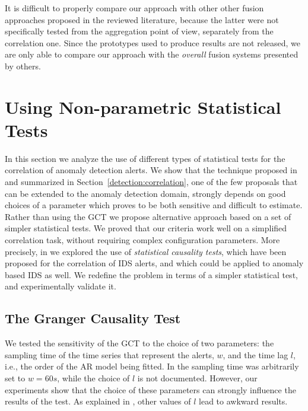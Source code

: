 It is difficult to properly compare our approach with other other fusion approaches proposed in the reviewed literature, because the latter were not specifically tested from the aggregation point of view, separately from the correlation one. Since the prototypes used to produce results are not released, we are only able to compare our approach with the \emph{overall} fusion systems presented by others. 

\section{Using Non-parametric Statistical Tests}
\label{correlation:causality}
In this section we analyze the use of different types of statistical
tests for the correlation of anomaly detection alerts. We show that
the technique proposed in \citep{dblp:conf/raid/qinl03} and summarized
in Section~\ref{detection:correlation}, one of the few proposals that
can be extended to the anomaly detection domain, strongly depends on
good choices of a parameter which proves to be both sensitive and
difficult to estimate. Rather than using the \acf{GCT} we propose
alternative approach \citep{MaggiZaneroRAID07} based on a set of
simpler statistical tests. We proved that our criteria work well on a
simplified correlation task, without requiring complex configuration
parameters. More precisely, in \citep{MaggiZaneroRAID07} we explored
the use of \emph{statistical causality tests}, which have been
proposed for the correlation of \ac{IDS} alerts, and which
could be applied to anomaly based \ac{IDS} as well. We
redefine the problem in terms of a simpler statistical test, and
experimentally validate it.

\subsection{The Granger Causality Test}
\label{correlation:causality:grang-caus-test}
We tested the sensitivity of the \ac{GCT} to the choice of
two parameters: the sampling time of the time series that represent
the alerts, $w$, and the time lag $l$, i.e., the order of the
\ac{AR} model being fitted. In \citep{dblp:conf/raid/qinl03}
the sampling time was arbitrarily set to $w = 60s$, while the choice
of $l$ is not documented. However, our experiments show that the
choice of these parameters can strongly influence the results of the
test. As explained in \citep{2009_maggi_zanero_matteucci_fusion},
other values of $l$ lead to awkward results.


